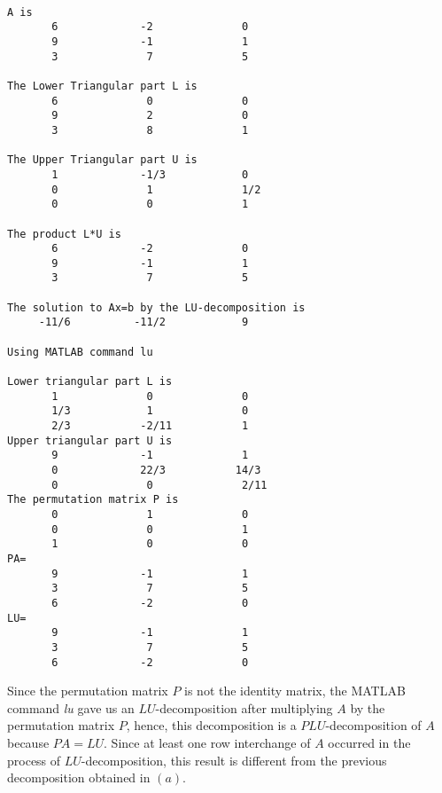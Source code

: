 \begin{sol}
\begin{verbatim}
\end{verbatim}

\begin{outputs}

\begin{verbatim}

A is
       6             -2              0
       9             -1              1
       3              7              5

The Lower Triangular part L is
       6              0              0
       9              2              0
       3              8              1

The Upper Triangular part U is
       1             -1/3            0
       0              1              1/2
       0              0              1

The product L*U is
       6             -2              0
       9             -1              1
       3              7              5

The solution to Ax=b by the LU-decomposition is
     -11/6          -11/2            9

Using MATLAB command lu

Lower triangular part L is
       1              0              0
       1/3            1              0
       2/3           -2/11           1
Upper triangular part U is
       9             -1              1
       0             22/3           14/3
       0              0              2/11
The permutation matrix P is
       0              1              0
       0              0              1
       1              0              0
PA=
       9             -1              1
       3              7              5
       6             -2              0
LU=
       9             -1              1
       3              7              5
       6             -2              0

\end{verbatim}

\end{outputs}

\noindent Since the permutation matrix $P$ is not the identity matrix, the MATLAB command \textit{lu} gave us an $LU$-decomposition after multiplying $A$ by the permutation matrix $P$, hence, this decomposition is a $PLU$-decomposition of $A$ because $PA=LU$. Since at least one row interchange of $A$ occurred in the process of $LU$-decomposition, this result is different from the previous decomposition obtained in $(a)$.

\end{sol}



